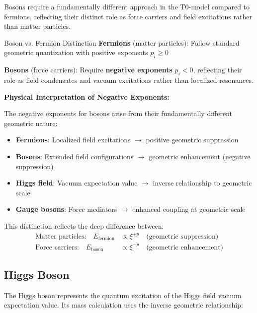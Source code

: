 \documentclass[12pt,a4paper]{article}
\begin{document}
	Bosons require a fundamentally different approach in the T0-model compared to fermions, reflecting their distinct role as force carriers and field excitations rather than matter particles.
	
	\begin{important}{Boson vs. Fermion Distinction}{}
		\textbf{Fermions} (matter particles): Follow standard geometric quantization with positive exponents $p_i \geq 0$
		
		\textbf{Bosons} (force carriers): Require \textbf{negative exponents} $p_i < 0$, reflecting their role as field condensates and vacuum excitations rather than localized resonances.
	\end{important}
	
	\textbf{Physical Interpretation of Negative Exponents:}
	
	The negative exponents for bosons arise from their fundamentally different geometric nature:
	
	\begin{itemize}
		\item \textbf{Fermions}: Localized field excitations $\rightarrow$ positive geometric suppression
		\item \textbf{Bosons}: Extended field configurations $\rightarrow$ geometric enhancement (negative suppression)
		\item \textbf{Higgs field}: Vacuum expectation value $\rightarrow$ inverse relationship to geometric scale
		\item \textbf{Gauge bosons}: Force mediators $\rightarrow$ enhanced coupling at geometric scale
	\end{itemize}
	
	This distinction reflects the deep difference between:
	\begin{align}
		\text{Matter particles:} \quad E_{\text{fermion}} &\propto \xi^{+p} \quad \text{(geometric suppression)} \\
		\text{Force carriers:} \quad E_{\text{boson}} &\propto \xi^{-p} \quad \text{(geometric enhancement)}
	\end{align}
	
	\subsection{Higgs Boson}
	\label{subsec:higgs_boson}
	
	The Higgs boson represents the quantum excitation of the Higgs field vacuum expectation value. Its mass calculation uses the inverse geometric relationship:
	
\end{document}
